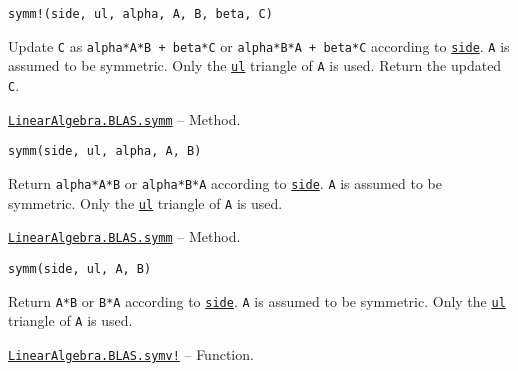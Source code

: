 \begin{adjustwidth}{2em}{0pt}


\begin{verbatim}
symm!(side, ul, alpha, A, B, beta, C)
\end{verbatim}

Update \texttt{C} as \texttt{alpha*A*B + beta*C} or \texttt{alpha*B*A + beta*C} according to \hyperlink{3128026147631247774}{\texttt{side}}. \texttt{A} is assumed to be symmetric. Only the \hyperlink{13880289478825450693}{\texttt{ul}} triangle of \texttt{A} is used. Return the updated \texttt{C}.



\end{adjustwidth}
\hypertarget{9865780980122223415}{}
\hyperlink{9865780980122223415}{\texttt{LinearAlgebra.BLAS.symm}}  -- {Method.}

\begin{adjustwidth}{2em}{0pt}


\begin{verbatim}
symm(side, ul, alpha, A, B)
\end{verbatim}

Return \texttt{alpha*A*B} or \texttt{alpha*B*A} according to \hyperlink{3128026147631247774}{\texttt{side}}. \texttt{A} is assumed to be symmetric. Only the \hyperlink{13880289478825450693}{\texttt{ul}} triangle of \texttt{A} is used.



\end{adjustwidth}
\hypertarget{6400422753950359324}{}
\hyperlink{6400422753950359324}{\texttt{LinearAlgebra.BLAS.symm}}  -- {Method.}

\begin{adjustwidth}{2em}{0pt}


\begin{verbatim}
symm(side, ul, A, B)
\end{verbatim}

Return \texttt{A*B} or \texttt{B*A} according to \hyperlink{3128026147631247774}{\texttt{side}}. \texttt{A} is assumed to be symmetric. Only the \hyperlink{13880289478825450693}{\texttt{ul}} triangle of \texttt{A} is used.



\end{adjustwidth}
\hypertarget{11756106038468185414}{}
\hyperlink{11756106038468185414}{\texttt{LinearAlgebra.BLAS.symv!}}  -- {Function.}

